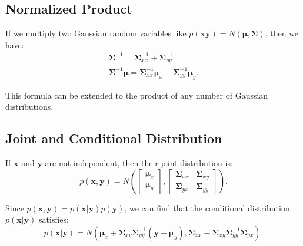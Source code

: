 \subsection{Normalized Product}
If we multiply two Gaussian random variables like $p\left( \mathbf{xy} \right) = N\left( {\boldsymbol{\mu} ,\boldsymbol{\Sigma}} \right)$, then we have:
\begin{equation}
\begin{array}{l}
{\boldsymbol{\Sigma}^{-1}} = \boldsymbol{\Sigma}_{xx}^{-1} + \boldsymbol{\Sigma}_{yy}^{-1} \\
\boldsymbol{\Sigma}^{-1} \boldsymbol{\mu} = \boldsymbol{\Sigma}_{xx}^{-1}{\boldsymbol{\mu}_x} + \boldsymbol{\Sigma}_{yy}^{-1}{\boldsymbol{\mu}_y}.
\end{array}
\end{equation}

This formula can be extended to the product of any number of Gaussian distributions.

\subsection{Joint and Conditional Distribution}
If $\mathbf{x}$ and $\mathbf{y}$ are not independent, then their joint distribution is: 
\begin{equation}
p(\mathbf{x}, \mathbf{y}) = N\left( {\left[ {\begin{array}{*{20}{c}}
		{{\boldsymbol{\mu}_x}}\\
		{{\boldsymbol{\mu}_y}}
		\end{array}} \right],\left[ {\begin{array}{*{20}{c}}
		{{\boldsymbol{\Sigma}_{xx}}}&{{\boldsymbol{\Sigma}_{xy}}}\\
		{{\boldsymbol{\Sigma}_{yx}}}&{{\boldsymbol{\Sigma}_{yy}}}
		\end{array}} \right]} \right).
\end{equation}

Since $p\left( {\mathbf{x}, \mathbf{y}} \right) = p\left( {\mathbf{x}|\mathbf{y}} \right)p\left( \mathbf{y} \right)$, we can find that the conditional distribution $p(\mathbf{x}|\mathbf{y})$ satisfies:
\begin{equation}
p\left( {\mathbf{x} | \mathbf{y} } \right) = N\left( {{\boldsymbol{\mu}_x} + {\boldsymbol{\Sigma}_{xy}} \boldsymbol{\Sigma}_{yy}^{ - 1} \left( {\mathbf{y} - {\boldsymbol{\mu}_y}} \right),{\boldsymbol{\Sigma}_{xx}} - {\boldsymbol{\Sigma}_{xy}} \boldsymbol{\Sigma}_{yy}^{ - 1}{\boldsymbol{\Sigma}_{yx}}} \right).
\end{equation}

